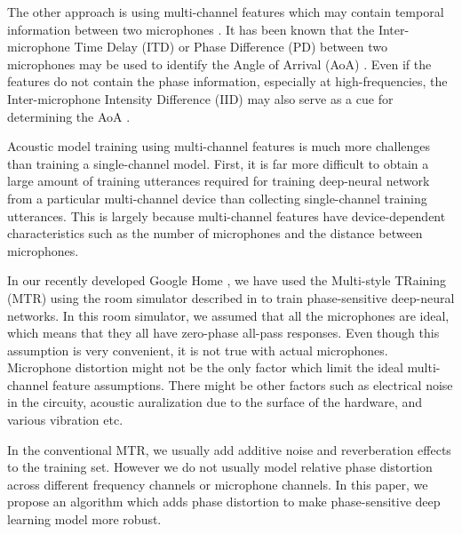 \documentclass[a4paper]{article}
\begin{document}
The other approach is using multi-channel features which may contain
temporal information between two microphones \cite{T_Sainath_ICASSP_2016_1}.
It has been known that the Inter-microphone Time Delay (ITD) or
Phase Difference (PD) between two microphones may be used to identify
the Angle of Arrival (AoA) \cite{C_Kim_INTERSPEECH_2009_1, C_Kim_ICASSP_2011_2}.
Even if the features do not contain the phase information, especially
at high-frequencies, the Inter-microphone Intensity Difference (IID)
may also serve as a cue for determining the AoA \cite{ColburnKulkarni05}.

Acoustic model training using multi-channel features is much more
challenges than training a single-channel model. First, it is far
more difficult to obtain a large amount of training utterances
required for training deep-neural network from a particular
multi-channel device than collecting single-channel training
utterances. This is largely because multi-channel features
have device-dependent characteristics such as the number of
microphones and the distance between microphones.

In our recently developed Google Home \cite{C_Kim_INTERSPEECH_2017_1,
B_Li_INTERSPEECH_2017_1}, we have used the Multi-style TRaining (MTR)
using the room simulator described
in \cite{C_Kim_INTERSPEECH_2017_1} to train phase-sensitive
deep-neural networks. In this room simulator, we
assumed that all the microphones are ideal, which means that they all
have zero-phase all-pass responses. Even though this assumption is very
convenient, it is not true with actual microphones. Microphone
distortion might not be the only factor which limit the ideal multi-
channel feature assumptions. There might be other factors such as
electrical noise in the circuity, acoustic auralization due to the
surface of the hardware, and various vibration etc.

In the conventional MTR, we usually add additive noise and
reverberation effects to the training set. However we do not
usually model relative phase distortion across different
frequency channels or microphone channels. In this paper, we propose
an algorithm which adds phase distortion to make phase-sensitive
deep learning model more robust.
%
%
\end{document}
